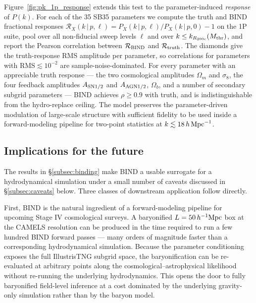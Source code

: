 \documentclass[linenumbers,trackchanges, twocolumn]{aastex701}
\begin{document}
Figure~\ref{fig:pk_1p_response} extends this test to the parameter-induced \emph{response} of $P(k)$. For each of the 35 SB35 parameters we compute the truth and \textsc{BIND} fractional responses $\mathcal{R}_X(k\,|\,p,\ell) = P_X(k\,|\,p,\ell)/P_X(k\,|\,p,0)-1$ on the 1P suite, pool over all non-fiducial sweep levels $\ell$ and over $k\leq k_{R_{200c}}(M_{\rm thr})$, and report the Pearson correlation between $\mathcal{R}_{\rm BIND}$ and $\mathcal{R}_{\rm truth}$. The diamonds give the truth-response RMS amplitude per parameter, so correlations for parameters with RMS$\lesssim 10^{-2}$ are sample-noise-dominated. For every parameter with an appreciable truth response --- the two cosmological amplitudes $\Omega_m$ and $\sigma_8$, the four feedback amplitudes $A_{\rm SN1/2}$ and $A_{\rm AGN1/2}$, $\Omega_b$, and a number of secondary subgrid parameters --- \textsc{BIND} achieves $\rho\geq 0.9$ with truth, and is indistinguishable from the hydro-replace ceiling. The model preserves the parameter-driven modulation of large-scale structure with sufficient fidelity to be used inside a forward-modeling pipeline for two-point statistics at $k\lesssim 18\,h\,{\rm Mpc}^{-1}$.

\subsection{Implications for the future}
\label{subsec:implications}

The results in \S\ref{subsec:binding} make \textsc{BIND} a usable surrogate for a hydrodynamical simulation under a small number of caveats discussed in \S\ref{subsec:caveats} below. Three classes of downstream application follow directly.

First, \textsc{BIND} is the natural ingredient of a forward-modeling pipeline for upcoming Stage IV cosmological surveys. A baryonified $L=50\,h^{-1}{\rm Mpc}$ box at the CAMELS resolution can be produced in the time required to run a few hundred \textsc{BIND} forward passes --- many orders of magnitude faster than a corresponding hydrodynamical simulation. Because the parameter conditioning exposes the full IllustrisTNG subgrid space, the baryonification can be re-evaluated at arbitrary points along the cosmological--astrophysical likelihood without re-running the underlying hydrodynamics. This opens the door to fully baryonified field-level inference at a cost dominated by the underlying gravity-only simulation rather than by the baryon model.
\end{document}
